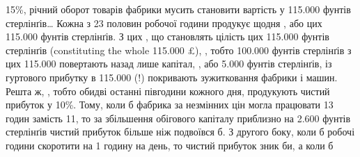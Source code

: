 \parcont{}  %
15\%, річний оборот товарів фабрики мусить становити вартість у 115.000 фунтів стерлінґів\dots{} Кожна з
23 половин робочої години продукує щодня , або  цих 115.000 фунтів стерлінґів. З цих ,
що становлять цілість цих 115.000 фунтів стерлінґів (constituting the whole 115.000 £), , тобто
100.000 фунтів стерлінґів з цих 115.000 повертають назад лише капітал, , або 5.000 фунтів
стерлінґів, із гуртового прибутку в 115.000 (!) покривають зужитковання фабрики і машин. Решта ж,
, тобто обидві останні півгодини кожного дня, продукують чистий прибуток
у 10\%. Тому, коли б фабрика за незмінних цін могла працювати 13 годин замість 11, то за
збільшення обігового
капіталу приблизно на 2.600 фунтів стерлінґів чистий прибуток більше ніж подвоївся б. З другого
боку, коли б робочі години скоротити на 1 годину на день, то чистий прибуток зник би, а коли б
